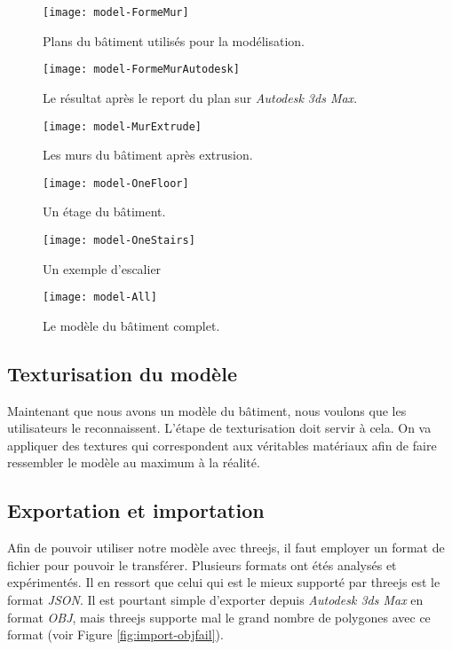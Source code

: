 \begin{figure}
\centering
\texttt{[image: model-FormeMur]}
\caption{Plans du bâtiment utilisés pour la modélisation.}
\label{fig:model-formemur}
\end{figure}

\begin{figure}
\centering
\texttt{[image: model-FormeMurAutodesk]}
\caption{Le résultat après le report du plan sur \textit{Autodesk 3ds Max}.}
\label{fig:model-formemurautodesk}
\end{figure}

\begin{figure}
	\centering
	\texttt{[image: model-MurExtrude]}
	\caption{Les murs du bâtiment après extrusion.}
	\label{fig:model-murextrude}
\end{figure}

\begin{figure}
	\centering
	\texttt{[image: model-OneFloor]}
	\caption{Un étage du bâtiment.}
	\label{fig:model-onefloor}
\end{figure}

\begin{figure}
	\centering
	\texttt{[image: model-OneStairs]}
	\caption{Un exemple d'escalier}
	\label{fig:model-onestairs}
\end{figure}

\begin{figure}
	\centering
	\texttt{[image: model-All]}
	\caption{Le modèle du bâtiment complet.}
	\label{fig:model-all}
\end{figure}


\subsection{Texturisation du modèle}
Maintenant que nous avons un modèle du bâtiment, nous voulons que les utilisateurs le reconnaissent. L'étape de texturisation doit servir à cela. On va appliquer des textures qui correspondent aux véritables matériaux afin de faire ressembler le modèle au maximum à la réalité.

\subsection{Exportation et importation}
Afin de pouvoir utiliser notre modèle avec threejs, il faut employer un format de fichier pour pouvoir le transférer. Plusieurs formats ont étés analysés et expérimentés. Il en ressort que celui qui est le mieux supporté par threejs est le format \emph{JSON}\cite{wiki-json}. Il est pourtant simple d'exporter depuis \textit{Autodesk 3ds Max} en format \emph{OBJ}, mais threejs supporte mal le grand nombre de polygones avec ce format (voir Figure \ref{fig:import-objfail}).

